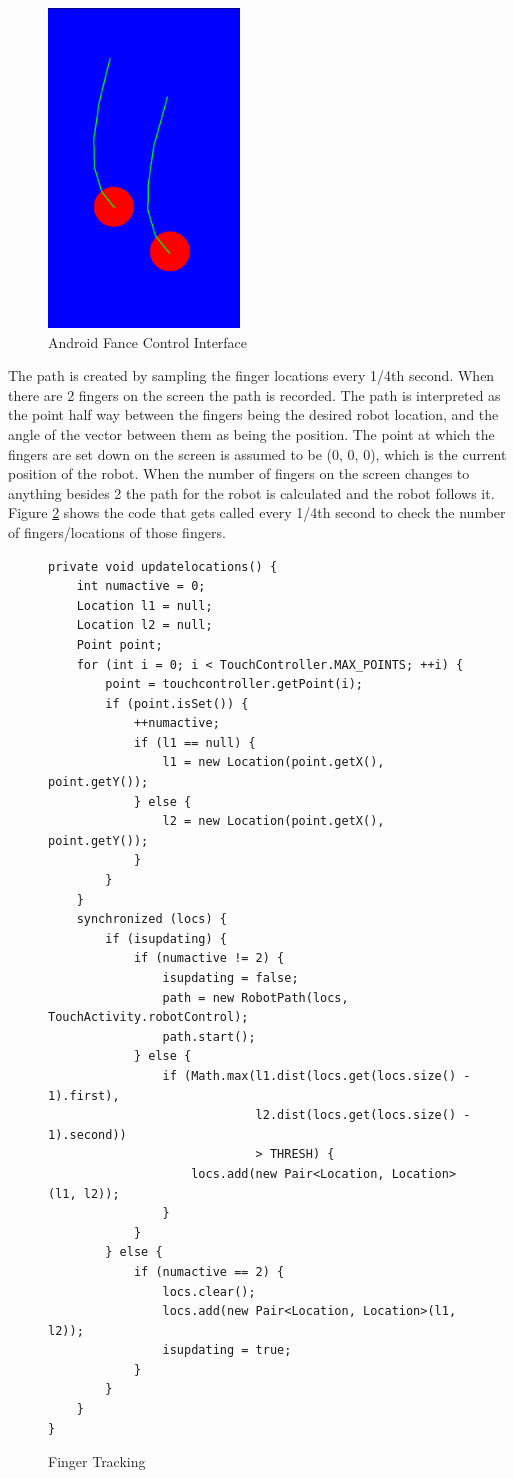 \begin{figure}[H]
    \begin{center}
        \includegraphics[width=2in]{images/fancy_control.png}
    \end{center}
    \caption{Android Fance Control Interface}
    \label{figure:fancy_control}
\end{figure}

The path is created by sampling the finger locations every 1/4th second.  When there are 2 fingers on the screen the path is recorded.  The path is interpreted as the point half way between the fingers being the desired robot location, and the angle of the vector between them as being the position.  The point at which the fingers are set down on the screen is assumed to be (0, 0, 0), which is the current position of the robot.  When the number of fingers on the screen changes to anything besides 2 the path for the robot is calculated and the robot follows it.  Figure \ref{figure:android_tracking} shows the code that gets called every 1/4th second to check the number of fingers/locations of those fingers.

\begin{figure}[H]
\lstset{tabsize=2}
\begin{lstlisting}
private void updatelocations() {
	int numactive = 0;
	Location l1 = null;
	Location l2 = null;
	Point point;
	for (int i = 0; i < TouchController.MAX_POINTS; ++i) {
		point = touchcontroller.getPoint(i);
		if (point.isSet()) {
			++numactive;
			if (l1 == null) {
				l1 = new Location(point.getX(), point.getY());
			} else {
				l2 = new Location(point.getX(), point.getY());
			}
		}
	}
	synchronized (locs) {
		if (isupdating) {
			if (numactive != 2) {
				isupdating = false;
				path = new RobotPath(locs, TouchActivity.robotControl);
				path.start();
			} else {
				if (Math.max(l1.dist(locs.get(locs.size() - 1).first), 
                             l2.dist(locs.get(locs.size() - 1).second)) 
                             > THRESH) {
					locs.add(new Pair<Location, Location>(l1, l2));
				}
			}
		} else {
			if (numactive == 2) {
				locs.clear();
				locs.add(new Pair<Location, Location>(l1, l2));
				isupdating = true;
			}
		}
	}
}
\end{lstlisting}
\caption{Finger Tracking}
\label{figure:android_tracking}
\end{figure}

